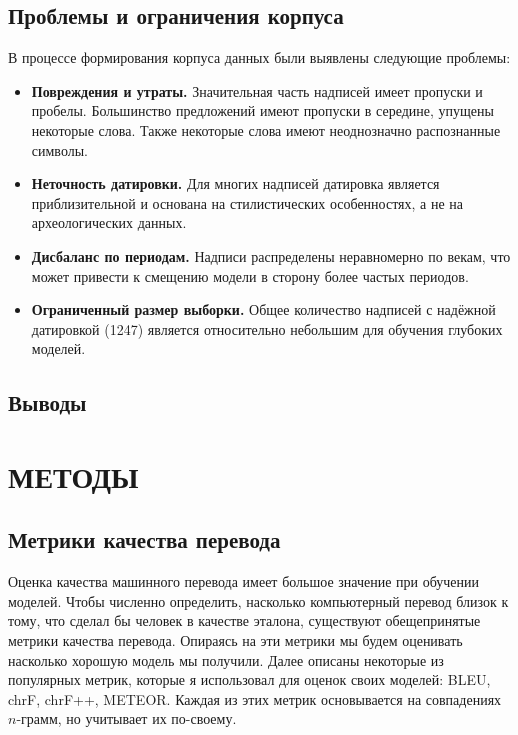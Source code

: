 \documentclass[14pt,a4paper]{extreport}
\begin{document}
\section{Проблемы и ограничения корпуса}

В процессе формирования корпуса данных были выявлены следующие проблемы:
\begin{itemize}
    \item \textbf{Повреждения и утраты.} Значительная часть надписей имеет пропуски и пробелы. Большинство предложений имеют пропуски в середине, упущены некоторые слова. Также некоторые слова имеют неоднозначно распознанные символы.
    
    \item \textbf{Неточность датировки.} Для многих надписей датировка является приблизительной и основана на стилистических особенностях, а не на археологических данных.
    
    \item \textbf{Дисбаланс по периодам.} Надписи распределены неравномерно по векам, что может привести к смещению модели в сторону более частых периодов.
    
    \item \textbf{Ограниченный размер выборки.} Общее количество надписей с надёжной датировкой (1247) является относительно небольшим для обучения глубоких моделей.
\end{itemize}

\section*{Выводы}



\chapter{МЕТОДЫ}

\section{Метрики качества перевода}
Оценка качества машинного перевода имеет большое значение при обучении моделей. Чтобы численно определить, насколько компьютерный перевод близок к тому, что сделал бы человек в качестве эталона, существуют обещепринятые метрики качества перевода. Опираясь на эти метрики мы будем оценивать насколько хорошую модель мы получили. Далее описаны некоторые из популярных метрик, которые я использовал для оценок своих моделей: BLEU, chrF, chrF++, METEOR. Каждая из этих метрик основывается на совпадениях $n$-грамм, но учитывает их по-своему.
\end{document}
